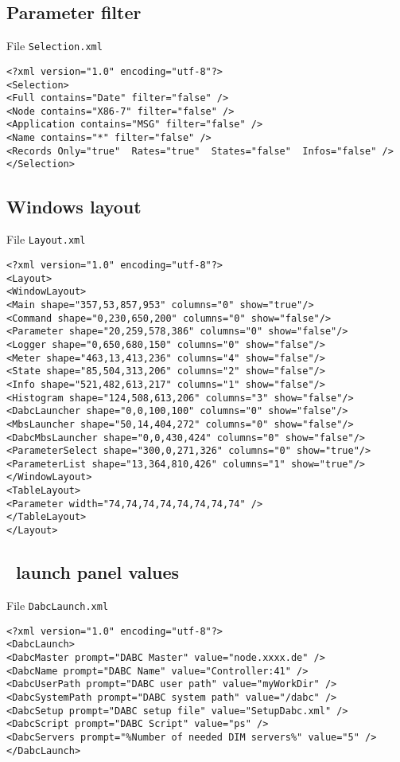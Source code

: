 \subsection{Parameter filter}
File {\tt Selection.xml}
{\small \begin{verbatim}
<?xml version="1.0" encoding="utf-8"?>
<Selection>
<Full contains="Date" filter="false" />
<Node contains="X86-7" filter="false" />
<Application contains="MSG" filter="false" />
<Name contains="*" filter="false" />
<Records Only="true"  Rates="true"  States="false"  Infos="false" />
</Selection>
\end{verbatim}
}
\subsection{Windows layout}
File {\tt Layout.xml}
{\small \begin{verbatim}
<?xml version="1.0" encoding="utf-8"?>
<Layout>
<WindowLayout>
<Main shape="357,53,857,953" columns="0" show="true"/>
<Command shape="0,230,650,200" columns="0" show="false"/>
<Parameter shape="20,259,578,386" columns="0" show="false"/>
<Logger shape="0,650,680,150" columns="0" show="false"/>
<Meter shape="463,13,413,236" columns="4" show="false"/>
<State shape="85,504,313,206" columns="2" show="false"/>
<Info shape="521,482,613,217" columns="1" show="false"/>
<Histogram shape="124,508,613,206" columns="3" show="false"/>
<DabcLauncher shape="0,0,100,100" columns="0" show="false"/>
<MbsLauncher shape="50,14,404,272" columns="0" show="false"/>
<DabcMbsLauncher shape="0,0,430,424" columns="0" show="false"/>
<ParameterSelect shape="300,0,271,326" columns="0" show="true"/>
<ParameterList shape="13,364,810,426" columns="1" show="true"/>
</WindowLayout>
<TableLayout>
<Parameter width="74,74,74,74,74,74,74,74" />
</TableLayout>
</Layout>
\end{verbatim}
}
\subsection[DABC launch panel values]{\dabc\ launch panel values}
File {\tt DabcLaunch.xml}
{\small \begin{verbatim}
<?xml version="1.0" encoding="utf-8"?>
<DabcLaunch>
<DabcMaster prompt="DABC Master" value="node.xxxx.de" />
<DabcName prompt="DABC Name" value="Controller:41" />
<DabcUserPath prompt="DABC user path" value="myWorkDir" />
<DabcSystemPath prompt="DABC system path" value="/dabc" />
<DabcSetup prompt="DABC setup file" value="SetupDabc.xml" />
<DabcScript prompt="DABC Script" value="ps" />
<DabcServers prompt="%Number of needed DIM servers%" value="5" />
</DabcLaunch>
\end{verbatim}
}
